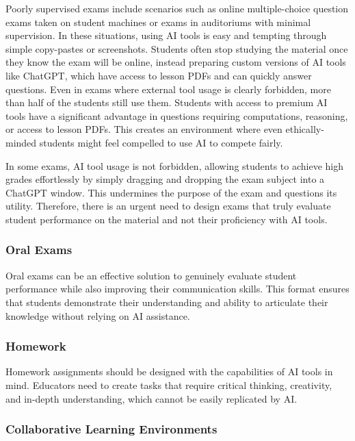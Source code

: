 \documentclass{article}
\begin{document}
Poorly supervised exams include scenarios such as online multiple-choice question exams taken on student machines or exams in auditoriums with minimal supervision. In these situations, using AI tools is easy and tempting through simple copy-pastes or screenshots. Students often stop studying the material once they know the exam will be online, instead preparing custom versions of AI tools like ChatGPT, which have access to lesson PDFs and can quickly answer questions. Even in exams where external tool usage is clearly forbidden, more than half of the students still use them. Students with access to premium AI tools have a significant advantage in questions requiring computations, reasoning, or access to lesson PDFs. This creates an environment where even ethically-minded students might feel compelled to use AI to compete fairly.

In some exams, AI tool usage is not forbidden, allowing students to achieve high grades effortlessly by simply dragging and dropping the exam subject into a ChatGPT window. This undermines the purpose of the exam and questions its utility. Therefore, there is an urgent need to design exams that truly evaluate student performance on the material and not their proficiency with AI tools.


\subsubsection{Oral Exams}

Oral exams can be an effective solution to genuinely evaluate student performance while also improving their communication skills. This format ensures that students demonstrate their understanding and ability to articulate their knowledge without relying on AI assistance.

\subsubsection{Homework}

Homework assignments should be designed with the capabilities of AI tools in mind. Educators need to create tasks that require critical thinking, creativity, and in-depth understanding, which cannot be easily replicated by AI.

\subsubsection{Collaborative Learning Environments}
\end{document}
